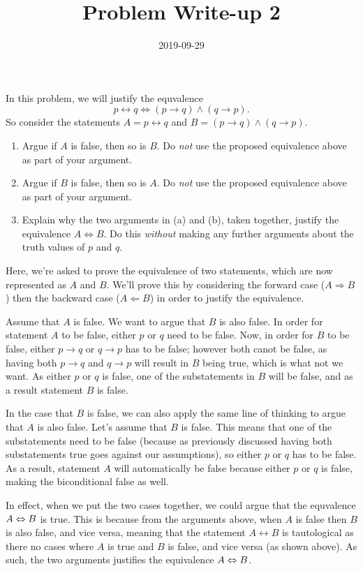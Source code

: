 \documentclass[a4paper,12pt]{article}
\title{Problem Write-up 2}
\date{2019-09-29}
\begin{document}
    \begin{problem}
        In this problem, we will justify the equvalence \[p \leftrightarrow q \Leftrightarrow (p \to q) \wedge (q \to p).\]
        So consider the statements \(A = p \leftrightarrow q\) and \(B = (p \to q) \wedge (q \to p)\).

        \begin{enumerate}
                \item Argue if \(A\) is false, then so is \(B\). Do \textit{not} use the proposed equivalence above as part of your argument.
                \item Argue if \(B\) is false, then so is \(A\). Do \textit{not} use the proposed equivalence above as part of your argument.
                \item Explain why the two arguments in (a) and (b), taken together, justify the equivalence \(A \Leftrightarrow B\). Do this \textit{without} making any further arguments about the truth values of \(p\) and \(q\).
        \end{enumerate}
    \end{problem}

    \begin{answer}
        Here, we're asked to prove the equivalence of two statements, which are now represented as \(A\) and \(B\). We'll prove this by considering the forward case (\(A \Rightarrow B\)) then the backward case (\( A \Leftarrow B \)) in order to justify the equivalence.

        Assume that \(A\) is false. We want to argue that \(B\) is also false. In order for statement \(A\) to be false, either \(p\) or \(q\) need to be false. Now, in order for \(B\) to be false, either \(p \to q\) or \(q \to p\) has to be false; however both canot be false, as having both \(p \to q\) and \(q \to p\) will result in \(B\) being true, which is what not we want. As either \(p\) or \(q\) is false, one of the substatements in \(B\) will be false, and as a result statement \(B\) is false.

        In the case that \(B\) is false, we can also apply the same line of thinking to argue that \(A\) is also false. Let's assume that \(B\) is false. This means that one of the substatements need to be false (because as previously discussed having both substatements true goes against our assumptions), so either \(p\) or \(q\) has to be false. As a result, statement \(A\) will automatically be false because either \(p\) or \(q\) is false, making the biconditional false as well.

        In effect, when we put the two cases together, we could argue that the equvalence \(A \Leftrightarrow B\) is true. This is because from the arguments above, when \(A\) is false then \(B\) is also false, and vice versa, meaning that the statement \(A \leftrightarrow B\) is tautological as there no cases where \(A\) is true and \(B\) is false, and vice versa (as shown above). As such, the two arguments justifies the equivalence \(A \Leftrightarrow B\).
    \end{answer}
\end{document}
